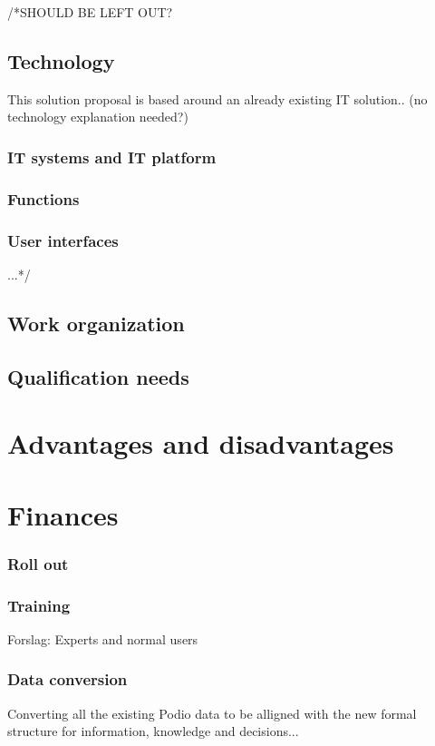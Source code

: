 /*SHOULD BE LEFT OUT?
\subsection{Technology}
This solution proposal is based around an already existing IT solution.. (no technology explanation needed?)
\subsubsection{IT systems and IT platform}

\subsubsection{Functions}

\subsubsection{User interfaces}
...*/

\subsection{Work organization}

\subsection{Qualification needs}

\section{Advantages and disadvantages}

\section{Finances}

\subsubsection{Roll out}

\subsubsection{Training}
Forslag: Experts and normal users
\subsubsection{Data conversion}
Converting all the existing Podio data to be alligned with the new formal structure for information, knowledge and decisions...

